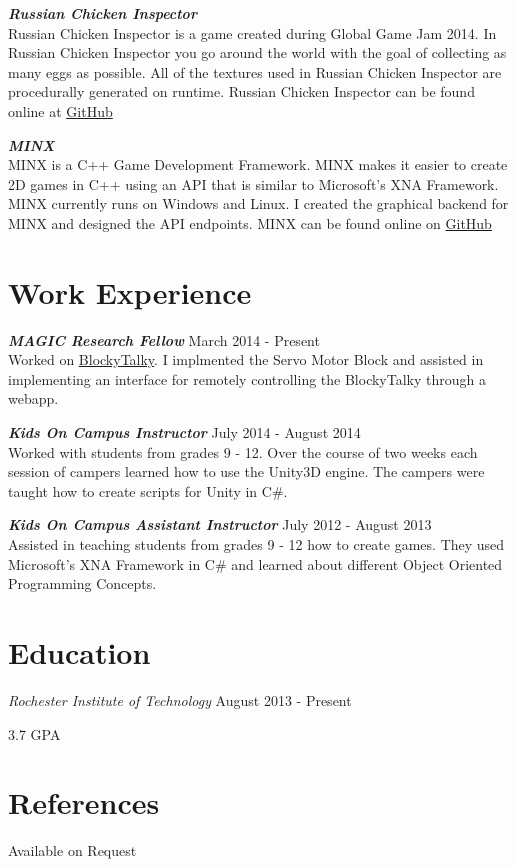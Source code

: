 \documentclass[line,margin]{res}
\begin{document}
\begin{resume}
{\textbf{\emph{Russian Chicken Inspector}}}\\
Russian Chicken Inspector is a game created during Global Game Jam 2014. In Russian Chicken Inspector
you go around the world with the goal of collecting as many eggs as possible. All of the textures used
in Russian Chicken Inspector are procedurally generated on runtime. Russian Chicken Inspector can be
found online at \href {https://github.com/liam-middlebrook/Russian-Chicken-Inspector}{GitHub}

{\textbf{\emph{MINX}}}\\
MINX is a C++ Game Development Framework. MINX makes it easier to create 2D games in C++ using an API
that is similar to Microsoft's XNA Framework. MINX currently runs on Windows and Linux. I created the
graphical backend for MINX and designed the API endpoints. MINX can be found online on 
\href{https://github.com/GearChicken/MINX}{GitHub}


\section{Work Experience}

{\textbf{\emph{MAGIC Research Fellow}}} \hfill March 2014 - Present\\
Worked on \href{https://github.com/liam-middlebrook/blockytalky.git}{BlockyTalky}. I implmented
the Servo Motor Block and assisted in implementing an interface for remotely controlling the 
BlockyTalky through a webapp.

{\textbf{\emph{Kids On Campus Instructor}}} \hfill July 2014 - August 2014\\
Worked with students from grades 9 - 12. Over the course of two weeks each session of campers
learned how to use the Unity3D engine. The campers were taught how to create scripts for Unity
in C\#.

{\textbf{\emph{Kids On Campus Assistant Instructor}}} \hfill July 2012 - August 2013\\
Assisted in teaching students from grades 9 - 12 how to create games. They used Microsoft's 
XNA Framework in C\# and learned about different Object Oriented Programming Concepts.


\section{Education}
{\sl Rochester Institute of Technology} \hfill August 2013 - Present

 \hfill 3.7 GPA 


\section{References}
Available on Request


\end{resume}
\end{document}
